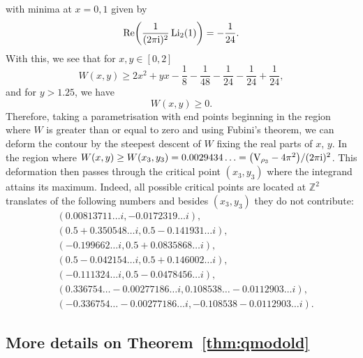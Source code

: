 \documentclass[pdftex]{sigma}
\numberwithin{equation}{section}
\def\BZ{\mathbb{Z}}
\def\Li{\mathrm{Li}}
\def\VC{\mathrm{VC}}
\def\BZ{\mathbb Z}
\def\Li{\operatorname{Li}}
\def\Re{\operatorname{Re}}
\def\VC{\mathrm{V}}
\begin{document}
with minima at $x=0,1$ given by
\[
 \Re\biggl(\frac{1}{(2\pi {\rm i})^2}\Li_{2}(1)\biggr)
  =
 -\frac{1}{24} .
\]
With this, we see that for $x,y\in[0,2]$
\[
 W(x,y)\geq2x^2+yx-\frac{1}{8}-\frac{1}{48}-\frac{1}{24}-\frac{1}{24}+\frac{1}{24},
\]
and for $y>1.25$, we have
\[
 W(x,y)\geq0 .
\]
Therefore, taking a parametrisation with end points beginning in the region where $W$ is greater than or equal to zero and using Fubini's theorem, we can deform the contour by the steepest descent of $W$ fixing the real parts of $x$, $y$.
In the region where $W(x,y)\geq W(x_3,y_3)=0.0029434\ldots=\bigl(\VC_{\rho_3}-4\pi^2\bigr)/(2\pi {\rm i})^2$. This deformation then passes through the critical point $(x_3,y_3)$ where the integrand attains its maximum.
Indeed, all possible critical points are located at $\BZ^2$ translates of the following numbers and besides $(x_3,y_3)$ they do not contribute:
\begin{align*}
 &(0.00813711\dots i,- 0.0172319\dots i) ,\\
 &(0.5 + 0.350548\dots i,
 0.5 - 0.141931\dots i) ,\\
 &(- 0.199662\dots i,
 0.5 + 0.0835868\dots i) ,\\
 &(0.5 - 0.042154\dots i,
 0.5 + 0.146002\dots i) ,\\
 &(- 0.111324\dots i,
 0.5 - 0.0478456\dots i) ,\\
 &(0.336754\ldots - 0.00277186\dots i,
 0.108538\ldots - 0.0112903\dots i) ,\\
 &(-0.336754\ldots - 0.00277186\dots i, -0.108538 -
 0.0112903\dots i) .
\end{align*}

\subsection{More details on Theorem~\ref{thm:qmodold}}\label{sec:more.deets}
\end{document}

